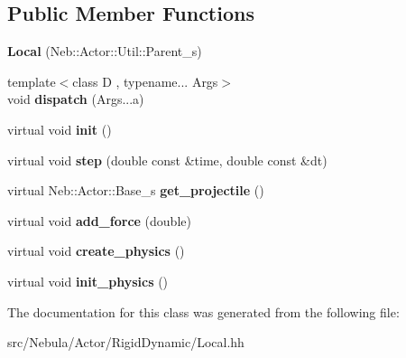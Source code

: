 \subsection*{\-Public \-Member \-Functions}
\begin{DoxyCompactItemize}
\item 
\hypertarget{classNeb_1_1Actor_1_1RigidDynamic_1_1Local_a19996ab602002a80690099bf7d139263}{{\bfseries \-Local} (\-Neb\-::\-Actor\-::\-Util\-::\-Parent\-\_\-s)}\label{classNeb_1_1Actor_1_1RigidDynamic_1_1Local_a19996ab602002a80690099bf7d139263}

\item 
\hypertarget{classNeb_1_1Actor_1_1RigidDynamic_1_1Local_a1dafed22652d9347d02dcfc8b3a6bc43}{{\footnotesize template$<$class D , typename... \-Args$>$ }\\void {\bfseries dispatch} (\-Args...\-a)}\label{classNeb_1_1Actor_1_1RigidDynamic_1_1Local_a1dafed22652d9347d02dcfc8b3a6bc43}

\item 
\hypertarget{classNeb_1_1Actor_1_1RigidDynamic_1_1Local_a09cb93996f6b8e2634f2abd96647a36a}{virtual void {\bfseries init} ()}\label{classNeb_1_1Actor_1_1RigidDynamic_1_1Local_a09cb93996f6b8e2634f2abd96647a36a}

\item 
\hypertarget{classNeb_1_1Actor_1_1RigidDynamic_1_1Local_ab66eda5361094ab21585124063fa4485}{virtual void {\bfseries step} (double const \&time, double const \&dt)}\label{classNeb_1_1Actor_1_1RigidDynamic_1_1Local_ab66eda5361094ab21585124063fa4485}

\item 
\hypertarget{classNeb_1_1Actor_1_1RigidDynamic_1_1Local_a0b27a22b4d20364e259528a8f034c067}{virtual \-Neb\-::\-Actor\-::\-Base\-\_\-s {\bfseries get\-\_\-projectile} ()}\label{classNeb_1_1Actor_1_1RigidDynamic_1_1Local_a0b27a22b4d20364e259528a8f034c067}

\item 
\hypertarget{classNeb_1_1Actor_1_1RigidDynamic_1_1Local_a1994cf777a29963beab71e4c906028f2}{virtual void {\bfseries add\-\_\-force} (double)}\label{classNeb_1_1Actor_1_1RigidDynamic_1_1Local_a1994cf777a29963beab71e4c906028f2}

\item 
\hypertarget{classNeb_1_1Actor_1_1RigidDynamic_1_1Local_af660af18894955111cb02e735fd8cc62}{virtual void {\bfseries create\-\_\-physics} ()}\label{classNeb_1_1Actor_1_1RigidDynamic_1_1Local_af660af18894955111cb02e735fd8cc62}

\item 
\hypertarget{classNeb_1_1Actor_1_1RigidDynamic_1_1Local_a8d90e6c23f6b0e95481144e8d2b98e40}{virtual void {\bfseries init\-\_\-physics} ()}\label{classNeb_1_1Actor_1_1RigidDynamic_1_1Local_a8d90e6c23f6b0e95481144e8d2b98e40}

\end{DoxyCompactItemize}


\-The documentation for this class was generated from the following file\-:\begin{DoxyCompactItemize}
\item 
src/\-Nebula/\-Actor/\-Rigid\-Dynamic/\-Local.\-hh\end{DoxyCompactItemize}
